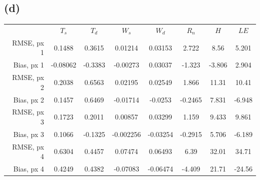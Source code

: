 \documentclass[letterpaper]{tufte-handout}
\begin{document}
\subsection{(d)}
{\small
  
}
\begin{table}
  \begin{tabular}{rccccccc} 
    &$T_s$ & $T_d$ & $W_s$ & $W_d$ & $R_n$ & $H$ & $LE$ \\
    RMSE, px 1 & 0.1488 & 0.3615 & 0.01214 & 0.03153 & 2.722 & 8.56 & 5.201\\
    Bias, px 1 & -0.08062 & -0.3383 & -0.00273 & 0.03037 & -1.323 & -3.806 & 2.904\\
    RMSE, px 2 &0.2038 & 0.6563 & 0.02195 & 0.02549 & 1.866 & 11.31 & 10.41\\
    Bias, px 2 &0.1457 & 0.6469 & -0.01714 & -0.0253 & -0.2465 & 7.831 & -6.948\\
    RMSE, px 3 &0.1723 & 0.2011 & 0.00857 & 0.03299 & 1.159 & 9.433 & 9.861\\
    Bias, px 3 &0.1066 & -0.1325 & -0.002256 & -0.03254 & -0.2915 & 5.706 & -6.189\\
    RMSE, px 4 &0.6304 & 0.4457 & 0.07474 & 0.06493 & 6.39 & 32.01 & 34.71\\
    Bias, px 4 & 0.4249 & 0.4382 & -0.07083 & -0.06474 & -4.409 & 21.71 & -24.56 
  \end{tabular}
\end{table}
\end{document}
